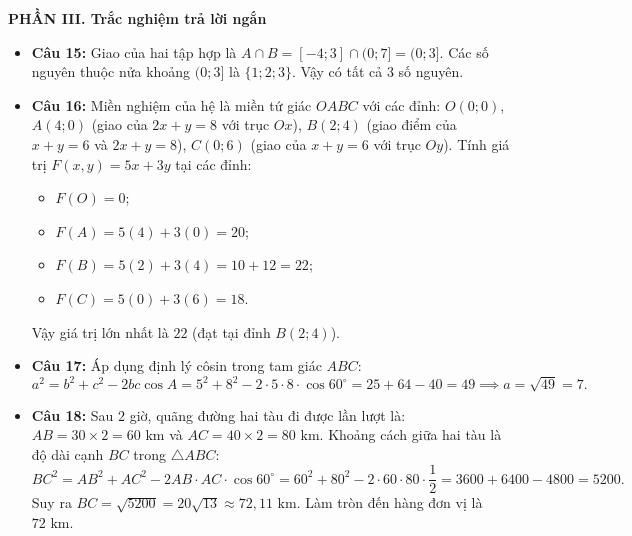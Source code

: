 \documentclass[12pt,a4paper]{article}
\begin{document}
\vspace{0.2cm}
\textbf{PHẦN III. Trắc nghiệm trả lời ngắn}
\begin{itemize}[leftmargin=0.6cm, itemsep=3pt]
    \item \textbf{Câu 15:} Giao của hai tập hợp là $A \cap B = [-4; 3] \cap (0; 7] = (0; 3]$.
    Các số nguyên thuộc nửa khoảng $(0; 3]$ là $\{1; 2; 3\}$. Vậy có tất cả $3$ số nguyên.
    \item \textbf{Câu 16:} Miền nghiệm của hệ là miền tứ giác $OABC$ với các đỉnh:
    $O(0; 0)$, $A(4; 0)$ (giao của $2x + y = 8$ với trục $Ox$), $B(2; 4)$ (giao điểm của $x + y = 6$ và $2x + y = 8$), $C(0; 6)$ (giao của $x + y = 6$ với trục $Oy$).
    Tính giá trị $F(x, y) = 5x + 3y$ tại các đỉnh:
    \begin{itemize}
        \item $F(O) = 0$;
        \item $F(A) = 5(4) + 3(0) = 20$;
        \item $F(B) = 5(2) + 3(4) = 10 + 12 = 22$;
        \item $F(C) = 5(0) + 3(6) = 18$.
    \end{itemize}
    Vậy giá trị lớn nhất là $22$ (đạt tại đỉnh $B(2; 4)$).
    \item \textbf{Câu 17:} Áp dụng định lý côsin trong tam giác $ABC$:
    \[
    a^2 = b^2 + c^2 - 2bc \cos A = 5^2 + 8^2 - 2 \cdot 5 \cdot 8 \cdot \cos 60^\circ = 25 + 64 - 40 = 49 \implies a = \sqrt{49} = 7.
    \]
    \item \textbf{Câu 18:} Sau $2$ giờ, quãng đường hai tàu đi được lần lượt là:
    $AB = 30 \times 2 = 60\text{ km}$ và $AC = 40 \times 2 = 80\text{ km}$.
    Khoảng cách giữa hai tàu là độ dài cạnh $BC$ trong $\triangle ABC$:
    \[
    BC^2 = AB^2 + AC^2 - 2 AB \cdot AC \cdot \cos 60^\circ = 60^2 + 80^2 - 2 \cdot 60 \cdot 80 \cdot \dfrac{1}{2} = 3600 + 6400 - 4800 = 5200.
    \]
    Suy ra $BC = \sqrt{5200} = 20\sqrt{13} \approx 72{,}11\text{ km}$. Làm tròn đến hàng đơn vị là $72\text{ km}$.
\end{itemize}
\end{document}
